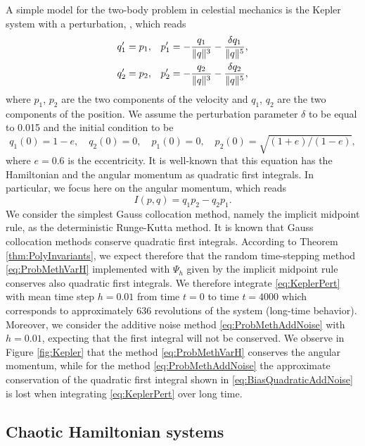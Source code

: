 \documentclass{siamart1116}
\numberwithin{theorem}{section}
\DeclarePairedDelimiter{\norm}{\|}{\|}
\begin{document}
A simple model for the two-body problem in celestial mechanics is the Kepler system with a perturbation, , which reads
\begin{equation}\label{eq:KeplerPert}
\begin{aligned}
	q_1' &= p_1, && p_1' = -\frac{q_1}{\norm{q}^3} - \frac{\delta q_1}{\norm{q}^5}, \\
	q_2' &= p_2, && p_2' = -\frac{q_2}{\norm{q}^3} - \frac{\delta q_2}{\norm{q}^5},
\end{aligned}
\end{equation}
where $p_1$, $p_2$ are the two components of the velocity and $q_1$, $q_2$ are the two components of the position. We assume the perturbation parameter $\delta$ to be equal to 0.015 and the initial condition to be
\begin{equation}
	q_1(0) = 1 − e,\quad q_2(0) = 0, \quad p_1(0) = 0, \quad p_2(0) = \sqrt{(1 + e)/(1 − e)},
\end{equation}
where $e = 0.6$ is the eccentricity. It is well-known that this equation has the Hamiltonian and the angular momentum as quadratic first integrals. In particular, we focus here on the angular momentum, which reads
\begin{equation}
	I(p, q) = q_1p_2 - q_2p_1.
\end{equation}
We consider the simplest Gauss collocation method, namely the implicit midpoint rule, as the deterministic Runge-Kutta method. It is known that Gauss collocation methods conserve quadratic first integrals. According to Theorem \ref{thm:PolyInvariants}, we expect therefore that the random time-stepping method \eqref{eq:ProbMethVarH} implemented with $\Psi_h$ given by the implicit midpoint rule conserves also quadratic first integrals. We therefore integrate \eqref{eq:KeplerPert} with mean time step $h = 0.01$ from time $t = 0$ to time $t = 4000$ which corresponds to approximately $636$ revolutions of the system (long-time behavior). Moreover, we consider the additive noise method \eqref{eq:ProbMethAddNoise} with $h = 0.01$, expecting that the first integral will not be conserved. We observe in Figure \ref{fig:Kepler} that the method \eqref{eq:ProbMethVarH} conserves the angular momentum, while for the method \eqref{eq:ProbMethAddNoise} the approximate conservation of the quadratic first integral shown in \eqref{eq:BiasQuadraticAddNoise} is lost when integrating \eqref{eq:KeplerPert} over long time.

\subsection{Chaotic Hamiltonian systems}\label{sec:Lorenz}
\end{document}
